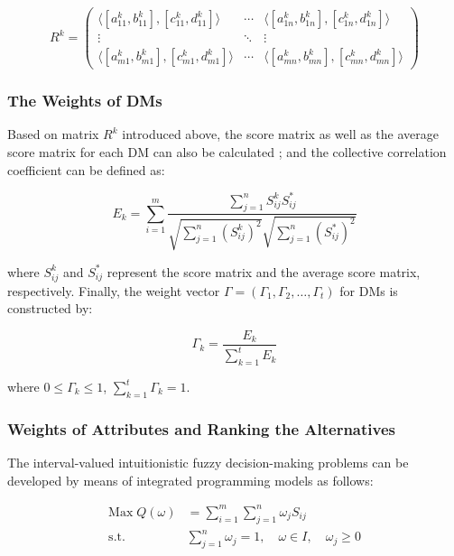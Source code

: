 \documentclass[10pt,twocolumn]{article}
\begin{document}
\begin{equation}
R^k =
\begin{pmatrix}
\langle [a^k_{11}, b^k_{11}], [c^k_{11}, d^k_{11}]\rangle
  & \cdots
  & \langle [a^k_{1n}, b^k_{1n}], [c^k_{1n}, d^k_{1n}]\rangle \\
\vdots & \ddots & \vdots \\
\langle [a^k_{m1}, b^k_{m1}], [c^k_{m1}, d^k_{m1}]\rangle
  & \cdots
  & \langle [a^k_{mn}, b^k_{mn}], [c^k_{mn}, d^k_{mn}]\rangle
\end{pmatrix}
\label{eq:ivifs}
\end{equation}

\subsubsection{The Weights of DMs}
Based on matrix $R^k$ introduced above, the score matrix as well as
the average score matrix for each DM can also be calculated
\cite{Ye2013}; and the collective correlation coefficient can be
defined as:

\begin{equation}
E_k = \sum_{i=1}^{m}
  \frac{\sum_{j=1}^{n} S^k_{ij} S^*_{ij}}
  {\sqrt{\sum_{j=1}^{n}(S^k_{ij})^2}
   \sqrt{\sum_{j=1}^{n}(S^*_{ij})^2}}
\label{eq:ek}
\end{equation}

where $S^k_{ij}$ and $S^*_{ij}$ represent the score matrix and the
average score matrix, respectively. Finally, the weight vector
$\Gamma = (\Gamma_1, \Gamma_2, \ldots, \Gamma_t)$ for DMs is
constructed by:

\begin{equation}
\Gamma_k = \frac{E_k}{\sum_{k=1}^{t} E_k}
\label{eq:gamma}
\end{equation}

where $0 \le \Gamma_k \le 1$, $\sum_{k=1}^{t} \Gamma_k = 1$.

\subsubsection{Weights of Attributes and Ranking the Alternatives}
The interval-valued intuitionistic fuzzy decision-making problems can
be developed by means of integrated programming models \cite{Ye2013}
as follows:

\begin{equation}
\begin{aligned}
  \text{Max}\; Q(\omega) &= \sum_{i=1}^{m} \sum_{j=1}^{n} \omega_j S_{ij}\\
  \text{s.t.} \quad &\sum_{j=1}^{n} \omega_j = 1,\quad
                     \omega \in I,\quad \omega_j \ge 0
\end{aligned}
\label{eq:maxq}
\end{equation}
\end{document}

